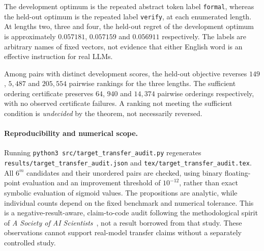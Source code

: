 

The development optimum is the repeated abstract token label
\texttt{formal}, whereas the held-out optimum is the repeated label
\texttt{verify}, at each enumerated length. At lengths two, three and
four, the held-out regret of the development optimum is approximately
$0.057181$, $0.057159$ and $0.056911$ respectively. The labels are
arbitrary names of fixed vectors, not evidence that either English
word is an effective instruction for real LLMs.

Among pairs with distinct development scores, the held-out objective
reverses $149$, $5,487$ and $205,554$ pairwise rankings for the three
lengths. The sufficient ordering certificate preserves $64$, $940$
and $14,374$ pairwise orderings respectively, with no observed
certificate failures. A ranking not meeting the sufficient condition
is \emph{undecided} by the theorem, not necessarily reversed.

\paragraph{Reproducibility and numerical scope.}
Running \texttt{python3 src/target\_transfer\_audit.py} regenerates
\texttt{results/target\_transfer\_audit.json} and
\texttt{tex/target\_transfer\_audit.tex}. All $6^m$ candidates and
their unordered pairs are checked, using binary floating-point
evaluation and an improvement threshold of $10^{-12}$, rather than
exact symbolic evaluation of sigmoid values. The propositions are
analytic, while individual counts depend on the fixed benchmark
and numerical tolerance. This is a negative-result-aware,
claim-to-code audit following the methodological spirit of
\emph{A Society of AI Scientists}~\cite{ahmad2026}, not a result
borrowed from that study. These observations cannot support
real-model transfer claims without a separately controlled study.
